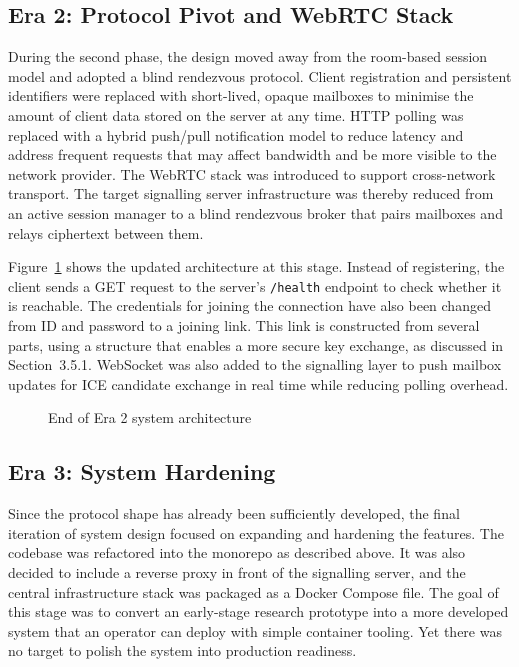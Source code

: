 \documentclass[12pt,a4paper,oneside]{report}
\begin{document}
\subsection{Era 2: Protocol Pivot and WebRTC Stack}
\label{sec:era2}

During the second phase, the design moved away from the room-based session model and adopted a blind rendezvous protocol. Client registration and persistent identifiers were replaced with short-lived, opaque mailboxes to minimise the amount of client data stored on the server at any time. HTTP polling was replaced with a hybrid push/pull notification model to reduce latency and address frequent requests that may affect bandwidth and be more visible to the network provider. The WebRTC stack was introduced to support cross-network transport. The target signalling server infrastructure was thereby reduced from an active session manager to a blind rendezvous broker that pairs mailboxes and relays ciphertext between them.

Figure~\ref{fig:era2} shows the updated architecture at this stage. Instead of registering, the client sends a GET request to the server's \texttt{/health} endpoint to check whether it is reachable. The credentials for joining the connection have also been changed from ID and password to a joining link. This link is constructed from several parts, using a structure that enables a more secure key exchange, as discussed in Section~3.5.1. WebSocket was also added to the signalling layer to push mailbox updates for ICE candidate exchange in real time while reducing polling overhead.

\begin{figure}[htbp]
  \centering
  \caption{End of Era 2 system architecture}
  \label{fig:era2}
\end{figure}


\subsection{Era 3: System Hardening}
\label{sec:era3}

Since the protocol shape has already been sufficiently developed, the final iteration of system design focused on expanding and hardening the features. The codebase was refactored into the monorepo as described above. It was also decided to include a reverse proxy in front of the signalling server, and the central infrastructure stack was packaged as a Docker Compose file. The goal of this stage was to convert an early-stage research prototype into a more developed system that an operator can deploy with simple container tooling. Yet there was no target to polish the system into production readiness.
\end{document}
